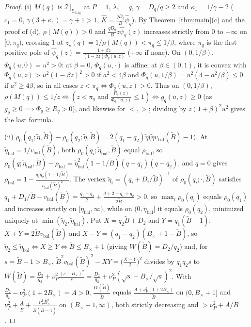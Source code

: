 \documentclass[11pt]{article}
\newcommand{\T}{\mathcal T}
\begin{document}
\begin{proof}
(i) $M(q)$ is $\T|_{\mathbb S_{\mathrm{diag}}}$ at $P=1$, $\lambda_1=q$, $\gamma=D_q/q\ge2$ and $\kappa_1=1/\gamma-2$ ($c_1=0$, $\gamma(3+\kappa_1)=\gamma+1>1$, $\widehat K=\frac{qD_q}B\widehat\psi_q$). By Theorem~\ref{thm:main}(c) and the proof of (d), $\rho(M(q))>0$ and $\frac{qD_q}Bz\widehat\psi_q(z)$ increases strictly from $0$ to $+\infty$ on $[0,\pi_q)$, crossing $1$ at $z_\star(q)=1/\rho(M(q))<\pi_q\le1/\beta$, where $\pi_q$ is the first positive pole of $\widehat\psi_q(z)=\frac{1+\beta z}{(1-\beta z)\Phi_q(u,z)}$ ($+\infty$ if none). On $(0,1/\beta)$, $\Phi_q(u,0)=u^2>0$: at $\beta=0$, $\Phi_q(u,\cdot)$ is affine; at $\beta\in(0,1)$, it is convex with $\Phi_q(u,z)>u^2(1-\beta z)^2>0$ if $a^2<4\beta$ and $\Phi_q(u,1/\beta)=u^2(4-a^2/\beta)\le0$ if $a^2\ge4\beta$, so in all cases $z<\pi_q\iff\Phi_q(u,z)>0$. Thus on $(0,1/\beta)$, $\rho(M(q))\le1/z\iff(z<\pi_q\text{ and }\frac{R_q(z)}{\Phi_q(u,z)}\le1)\iff g_q(u,z)\ge0$ (as $g_q\ge0\implies\Phi_q\ge R_q>0$), and likewise for $<,>$; dividing by $z(1+\beta)^2u^2$ gives the last formula.

(ii) $\rho_0(q_1;\tilde\eta,\tilde B)-\rho_0(q_2;\tilde\eta,\tilde B)=2(q_1-q_2)\tilde\eta\big(\tilde\eta v_{\mathrm{bal}}(\tilde B)-1\big)$. At $\tilde\eta_{\mathrm{bal}}=1/v_{\mathrm{bal}}(\tilde B)$, both $\rho_0(q_i;\tilde\eta_{\mathrm{bal}},\tilde B)$ equal $\rho_{\mathrm{bal}}$, so $\rho_0(q;\tilde\eta_{\mathrm{bal}},\tilde B)-\rho_{\mathrm{bal}}=\tilde\eta_{\mathrm{bal}}^2(1-1/\tilde B)(q-q_1)(q-q_2)$, and $q=0$ gives $\rho_{\mathrm{bal}}=1-\frac{q_1q_2(1-1/\tilde B)}{v_{\mathrm{bal}}(\tilde B)^2}$. The vertex $\tilde\eta_i=(q_i+D_i/\tilde B)^{-1}$ of $\rho_0(q_i;\cdot,\tilde B)$ satisfies $q_1+D_1/\tilde B-v_{\mathrm{bal}}(\tilde B)=\frac{q_1-q_2}2+\frac{d+2-q_1+q_2}{2\tilde B}>0$, so $\max_i\rho_0(q_i)$ equals $\rho_0(q_1)$ and increases strictly on $[\tilde\eta_{\mathrm{bal}},\infty)$, while on $(0,\tilde\eta_{\mathrm{bal}}]$ it equals $\rho_0(q_2)$, minimized uniquely at $\min(\tilde\eta_2,\tilde\eta_{\mathrm{bal}})$. Put $X=q_2\tilde B+D_2$ and $Y=q_1(\tilde B-1)$: $X+Y=2\tilde Bv_{\mathrm{bal}}(\tilde B)$ and $X-Y=(q_1-q_2)(B_\times+1-\tilde B)$, so $\tilde\eta_2\le\tilde\eta_{\mathrm{bal}}\iff X\ge Y\iff\tilde B\le B_\times+1$ (giving $W(\tilde B)=D_2/q_2$) and, for $s=\tilde B-1>B_\times$, $\tilde B^2v_{\mathrm{bal}}(\tilde B)^2-XY=\big(\frac{X-Y}2\big)^2$ divides by $q_1q_2s$ to $W(\tilde B)=\frac{D_2}{q_2}+\nu_P^2\frac{(s-B_\times)^2}s=\frac{D_2}{q_2}+\nu_P^2(\sqrt s-B_\times/\sqrt s)^2$. With $\frac{D_2}{q_2}-\nu_P^2(1+2B_\times)=A>0$, $\frac{W(\tilde B)}{\tilde B}$ equals $\frac{A+\nu_P^2(1+2B_\times)}{\tilde B}$ on $(0,B_\times+1]$ and $\nu_P^2+\frac A{\tilde B}+\frac{\nu_P^2B_\times^2}{\tilde B(\tilde B-1)}$ on $(B_\times+1,\infty)$, both strictly decreasing and $>\nu_P^2+A/\tilde B$.
\end{proof}
\end{document}
